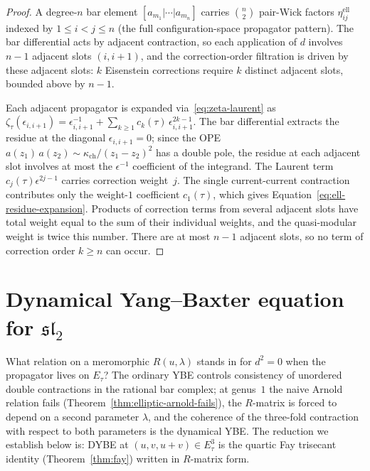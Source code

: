 \begin{proof}
A degree-$n$ bar element $[a_{m_1} | \cdots | a_{m_n}]$ carries
$\binom{n}{2}$ pair-Wick factors $\eta_{ij}^{\mathrm{ell}}$ indexed
by $1 \leq i < j \leq n$ (the full configuration-space propagator
pattern). The bar differential acts by adjacent contraction, so
each application of $d$ involves $n - 1$ adjacent slots
$(i, i{+}1)$, and the correction-order filtration is
driven by these adjacent slots: $k$ Eisenstein corrections require
$k$ distinct adjacent slots, bounded above by $n - 1$.

Each adjacent propagator is expanded via~\eqref{eq:zeta-laurent} as
$\zeta_\tau(\epsilon_{i,i+1}) = \epsilon_{i,i+1}^{-1} + \sum_{k \geq 1}
c_k(\tau)\,\epsilon_{i,i+1}^{2k-1}$. The bar differential extracts
the residue at the diagonal $\epsilon_{i,i+1} = 0$; since the OPE
$a(z_1)\,a(z_2) \sim \kappa_{\mathrm{ch}}/(z_1 - z_2)^2$ has a
double pole, the residue at each adjacent slot involves at most
the $\epsilon^{-1}$ coefficient of the integrand. The Laurent
term $c_j(\tau)\epsilon^{2j-1}$ carries correction weight~$j$. The
single current-current contraction contributes only the weight-$1$
coefficient $c_1(\tau)$, which gives
Equation~\eqref{eq:ell-residue-expansion}. Products of correction terms
from several adjacent slots have total weight equal to the sum of their
individual weights, and the quasi-modular weight is twice this number.
There are at most $n-1$ adjacent slots, so no term of correction order
$k\geq n$ can occur.
\end{proof}


\section{\texorpdfstring{Dynamical Yang--Baxter equation for $\mathfrak{sl}_2$}{Dynamical Yang--Baxter equation for sl2}}
\label{sec:dynamical-ybe-sl2}

What relation on a meromorphic $R(u,\lambda)$ stands in for $d^2 = 0$ when the propagator lives on $E_\tau$? The ordinary YBE controls consistency of unordered double contractions in the rational bar complex; at genus~$1$ the naive Arnold relation fails (Theorem~\ref{thm:elliptic-arnold-fails}), the $R$-matrix is forced to depend on a second parameter $\lambda$, and the coherence of the three-fold contraction with respect to both parameters is the dynamical YBE. The reduction we establish below is: DYBE at $(u,v,u{+}v) \in E_\tau^3$ is the quartic Fay trisecant identity (Theorem~\ref{thm:fay}) written in $R$-matrix form.

